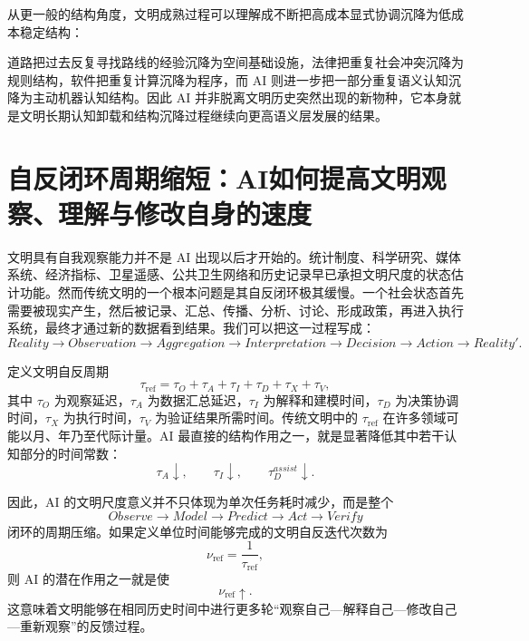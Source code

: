 从更一般的结构角度，文明成熟过程可以理解成不断把高成本显式协调沉降为低成本稳定结构：
\begin{statementbox}
\centering
{}
\end{statementbox}
道路把过去反复寻找路线的经验沉降为空间基础设施，法律把重复社会冲突沉降为规则结构，软件把重复计算沉降为程序，而 AI 则进一步把一部分重复语义认知沉降为主动机器认知结构。因此 AI 并非脱离文明历史突然出现的新物种，它本身就是文明长期认知卸载和结构沉降过程继续向更高语义层发展的结果。

\section{自反闭环周期缩短：AI如何提高文明观察、理解与修改自身的速度}

文明具有自我观察能力并不是 AI 出现以后才开始的。统计制度、科学研究、媒体系统、经济指标、卫星遥感、公共卫生网络和历史记录早已承担文明尺度的状态估计功能。然而传统文明的一个根本问题是其自反闭环极其缓慢。一个社会状态首先需要被现实产生，然后被记录、汇总、传播、分析、讨论、形成政策，再进入执行系统，最终才通过新的数据看到结果。我们可以把这一过程写成：
\begin{equation}
Reality
\rightarrow
Observation
\rightarrow
Aggregation
\rightarrow
Interpretation
\rightarrow
Decision
\rightarrow
Action
\rightarrow
Reality'.
\end{equation}

定义文明自反周期
\begin{equation}
\tau_{\mathrm{ref}}
=
\tau_O
+
\tau_A
+
\tau_I
+
\tau_D
+
\tau_X
+
\tau_V,
\end{equation}
其中 $\tau_O$ 为观察延迟，$\tau_A$ 为数据汇总延迟，$\tau_I$ 为解释和建模时间，$\tau_D$ 为决策协调时间，$\tau_X$ 为执行时间，$\tau_V$ 为验证结果所需时间。传统文明中的 $\tau_{\mathrm{ref}}$ 在许多领域可能以月、年乃至代际计量。AI 最直接的结构作用之一，就是显著降低其中若干认知部分的时间常数：
\begin{equation}
\tau_A\downarrow,\qquad
\tau_I\downarrow,\qquad
\tau_D^{assist}\downarrow.
\end{equation}

因此，AI 的文明尺度意义并不只体现为单次任务耗时减少，而是整个
\begin{equation}
Observe
\rightarrow
Model
\rightarrow
Predict
\rightarrow
Act
\rightarrow
Verify
\end{equation}
闭环的周期压缩。如果定义单位时间能够完成的文明自反迭代次数为
\begin{equation}
\nu_{\mathrm{ref}}
=
\frac{1}{\tau_{\mathrm{ref}}},
\end{equation}
则 AI 的潜在作用之一就是使
\begin{equation}
\nu_{\mathrm{ref}}\uparrow.
\end{equation}
这意味着文明能够在相同历史时间中进行更多轮“观察自己—解释自己—修改自己—重新观察”的反馈过程。

